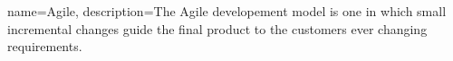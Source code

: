 {
  name={Agile},
  description={The Agile developement model is one in which small incremental changes guide the final product to the customers ever changing requirements.}
}